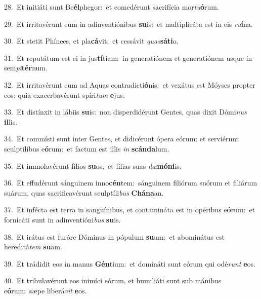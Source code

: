 {\numbfont\textcolor{\numbcolor}{28.}}~Et initiáti sunt Be\-\textbf{él}\-phegor:~\star et comedérunt sacrifícia mor\-\textit{tu}\-\textbf{ó}rum.\par
{\numbfont\textcolor{\numbcolor}{29.}}~Et irritavérunt eum in adinventiónibus \textbf{su}\-is:~\star et multiplicáta est in eis \textit{ru}\-\textbf{í}na.\par
{\numbfont\textcolor{\numbcolor}{30.}}~Et stetit Phínees, et pla\-\textbf{cá}\-vit:~\star et cessávit \textit{quas}\-\textbf{sá}\textbf{ti}o.\par
{\numbfont\textcolor{\numbcolor}{31.}}~Et reputátum est ei in jus\-\textbf{tí}\-tiam:~\star in generatiónem et generatiónem usque in sem\-\textit{pi}\-\textbf{tér}num.\par
{\numbfont\textcolor{\numbcolor}{32.}}~Et irritavérunt eum ad Aquas contradicti\-\textbf{ó}\-nis:~\star et vexátus est Móyses propter eos: quia exacerbavérunt spíri\textit{tum} \textbf{e}\-jus.\par
{\numbfont\textcolor{\numbcolor}{33.}}~Et distínxit in lábiis \textbf{su}\-is:~\star non disperdidérunt Gentes, quas dixit Dómi\textit{nus} \textbf{il}\-lis.\par
{\numbfont\textcolor{\numbcolor}{34.}}~Et commísti sunt inter Gentes, et didicérunt ópera eórum: et serviérunt sculptílibus e\-\textbf{ó}\-rum:~\star et factum est illis \textit{in} \textbf{scán}\-\textbf{da}lum.\par
{\numbfont\textcolor{\numbcolor}{35.}}~Et immolavérunt fílios \textbf{su}\-os,~\star et fílias suas \textit{dæ}\-\textbf{mó}\textbf{ni}is.\par
{\numbfont\textcolor{\numbcolor}{36.}}~Et effudérunt sánguinem inno\-\textbf{cén}\-tem:~\star sánguinem filiórum suórum et filiárum suárum, quas sacrificavérunt sculptíli\textit{bus} \textbf{Chá}\-\textbf{na}an.\par
{\numbfont\textcolor{\numbcolor}{37.}}~Et infécta est terra in sanguínibus, et contamináta est in opéribus e\-\textbf{ó}\-rum:~\star et fornicáti sunt in adinventióni\textit{bus} \textbf{su}\-is.\par
{\numbfont\textcolor{\numbcolor}{38.}}~Et irátus est furóre Dóminus in pópulum \textbf{su}\-um:~\star et abominátus est hereditá\textit{tem} \textbf{su}\-am.\par
{\numbfont\textcolor{\numbcolor}{39.}}~Et trádidit eos in manus \textbf{Gén}\-tium:~\star et domináti sunt eórum qui odé\textit{runt} \textbf{e}\-os.\par
{\numbfont\textcolor{\numbcolor}{40.}}~Et tribulavérunt eos inimíci eórum, et humiliáti sunt sub mánibus e\-\textbf{ó}\-rum:~\star sæpe liberá\textit{vit} \textbf{e}\-os.\par
